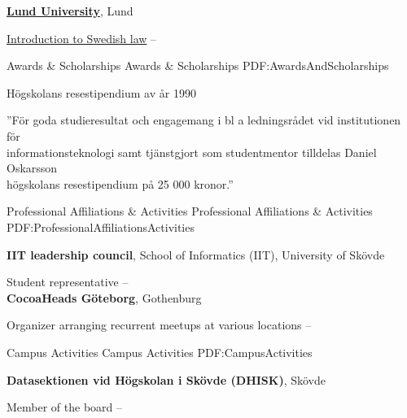 \documentclass[letterpaper,MMMyyyy,nonstopmode]{resume}
\begin{document}
\begin{Body}
\BigGap
\Entry
\href{https://www.law.lu.se/}
{\textbf{Lund University}},
Lund

\Gap
\BulletItem
\href{https://www.lu.se/lubas/i-uoh-lu-JURF11}
{Introduction to Swedish law}
\hfill
{} --


\Section
{Awards \&\newline
Scholarships}
{Awards \& Scholarships}
{PDF:AwardsAndScholarships}

\BulletItem
Högskolans resestipendium av år 1990
\hfill
{}
\begin{Detail}
\Item
''För goda studieresultat och engagemang i bl a ledningsrådet vid institutionen för\\
informationsteknologi samt tjänstgjort som studentmentor tilldelas Daniel Oskarsson\\
högskolans resestipendium på 25 000 kronor.''
\end{Detail}


\Section
{Professional Affiliations\newline
\& Activities}
{Professional Affiliations \& Activities}
{PDF:ProfessionalAffiliationsActivities}

\Entry
\textbf{IIT leadership council}, School of Informatics (IIT), University of Skövde

\Gap
\BulletItem
Student representative
\hfill
{} -- 
\\
\Entry
\textbf{CocoaHeads Göteborg}, Gothenburg

\Gap
\BulletItem
Organizer arranging recurrent meetups at various locations
\hfill
{} -- 


\Section
{Campus Activities}
{Campus Activities}
{PDF:CampusActivities}

\Entry
\textbf{Datasektionen vid Högskolan i Skövde (DHISK)}, Skövde

\Gap
\BulletItem
Member of the board
\hfill
{} -- 



\end{Body}
\end{document}
